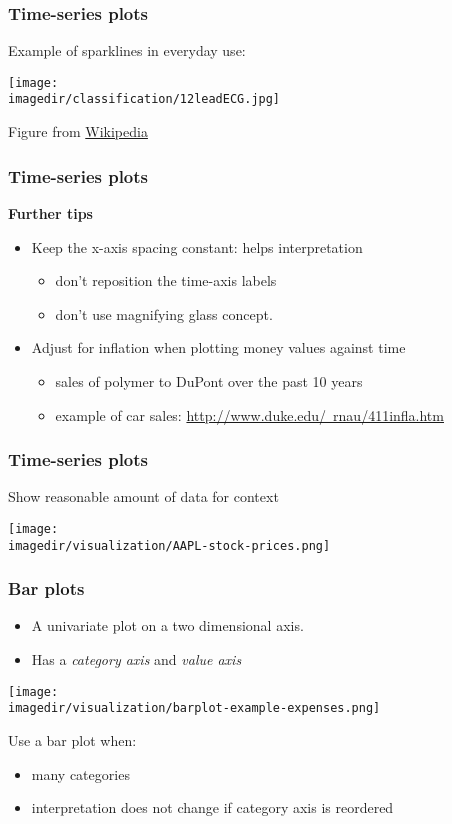 \begin{frame}\frametitle{Time-series plots}
	
	Example of sparklines in everyday use:
	\begin{center}
		\texttt{[image: \\imagedir/classification/12leadECG.jpg]}
	\end{center}
	Figure from \href{http://en.wikipedia.org/wiki/File:12leadECG.jpg}{Wikipedia}
\end{frame}

\begin{frame}\frametitle{Time-series plots}
	
	\textbf{Further tips}
	\begin{itemize}
		\item	Keep the x-axis spacing constant: helps interpretation 
		\begin{itemize}
			\item	don't reposition the time-axis labels 
			\item	don't use magnifying glass concept. 
		\end{itemize}
	\end{itemize}
	\begin{itemize}
		\item	Adjust for inflation when plotting money values against time 
		\begin{itemize}
			\item	sales of polymer to DuPont over the past 10 years 
			\item	example of car sales: \href{http://www.duke.edu/~rnau/411infla.htm}{http://www.duke.edu/~rnau/411infla.htm} 
		\end{itemize}
	\end{itemize}
\end{frame}

\begin{frame}\frametitle{Time-series plots}
	
	Show reasonable amount of data for context 
	\begin{center}
		\texttt{[image: \\imagedir/visualization/AAPL-stock-prices.png]}
	\end{center}
\end{frame}

\begin{frame}\frametitle{Bar plots}
	\begin{itemize}
		\item	A univariate plot on a two dimensional axis. 
		\item	Has a \emph{category axis} and \emph{value axis} 
	\end{itemize}
	\begin{center}
		\texttt{[image: \\imagedir/visualization/barplot-example-expenses.png]}
	\end{center}
	Use a bar plot when: 
	\begin{itemize}
		\item	many categories 
		\item	interpretation does not change if category axis is reordered 
	\end{itemize}
\end{frame}

